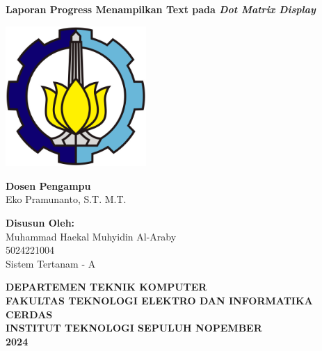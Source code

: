 \documentclass[a4paper,12pt]{article} %
\begin{document}
\begin{titlepage}
    \centering
    \vspace*{1cm}
    
     {\Large \textbf{Laporan Progress Menampilkan Text pada \textit{Dot Matrix Display}}}

    \vfill
    \vspace{2cm}

    \includegraphics[width=0.4\textwidth]{./logo.png} %
    \vfill

    \vspace{1cm}
    \begin{onehalfspace}
    \textbf{Dosen Pengampu}\\
    Eko Pramunanto, S.T. M.T.

    \vspace{1cm}

    \textbf{Disusun Oleh:}\\
    Muhammad Haekal Muhyidin Al-Araby\\ 
    5024221004\\
    Sistem Tertanam - A
    \end{onehalfspace}

    \vfill

    \textbf{DEPARTEMEN TEKNIK KOMPUTER\\
    FAKULTAS TEKNOLOGI ELEKTRO DAN INFORMATIKA CERDAS\\
    INSTITUT TEKNOLOGI SEPULUH NOPEMBER\\2024}
\end{titlepage}

\end{document}
